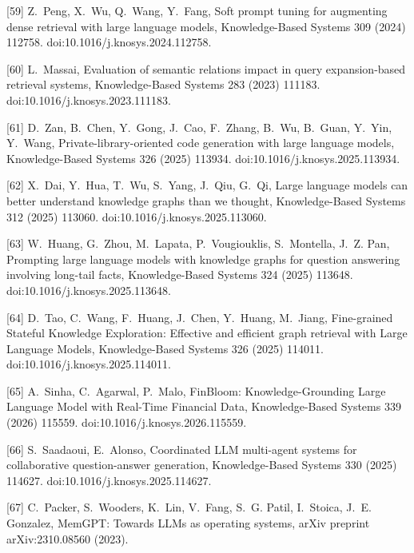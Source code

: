 \documentclass[11pt]{article}
\begin{document}
[59] 
Z.~Peng, X.~Wu, Q.~Wang, Y.~Fang, {Soft prompt tuning for augmenting dense
  retrieval with large language models}, Knowledge-Based Systems 309 (2024)
  112758.
  doi:10.1016/j.knosys.2024.112758.



[60] 
L.~Massai, {Evaluation of semantic relations impact in query expansion-based
  retrieval systems}, Knowledge-Based Systems 283 (2023) 111183.
  doi:10.1016/j.knosys.2023.111183.



[61] 
D.~Zan, B.~Chen, Y.~Gong, J.~Cao, F.~Zhang, B.~Wu, B.~Guan, Y.~Yin, Y.~Wang,
  {Private-library-oriented code generation with large language models},
  Knowledge-Based Systems 326 (2025) 113934.
  doi:10.1016/j.knosys.2025.113934.



[62] 
X.~Dai, Y.~Hua, T.~Wu, S.~Yang, J.~Qiu, G.~Qi, {Large language models can
  better understand knowledge graphs than we thought}, Knowledge-Based Systems
  312 (2025) 113060.
  doi:10.1016/j.knosys.2025.113060.



[63] 
W.~Huang, G.~Zhou, M.~Lapata, P.~Vougiouklis, S.~Montella, J.~Z. Pan,
  {Prompting large language models with knowledge graphs for question answering
  involving long-tail facts}, Knowledge-Based Systems 324 (2025) 113648.
  doi:10.1016/j.knosys.2025.113648.



[64] 
D.~Tao, C.~Wang, F.~Huang, J.~Chen, Y.~Huang, M.~Jiang, {Fine-grained Stateful
  Knowledge Exploration: Effective and efficient graph retrieval with Large
  Language Models}, Knowledge-Based Systems 326 (2025) 114011.
  doi:10.1016/j.knosys.2025.114011.



[65] 
A.~Sinha, C.~Agarwal, P.~Malo, {FinBloom: Knowledge-Grounding Large Language
  Model with Real-Time Financial Data}, Knowledge-Based Systems 339 (2026)
  115559.
  doi:10.1016/j.knosys.2026.115559.



[66] 
S.~Saadaoui, E.~Alonso, {Coordinated LLM multi-agent systems for collaborative
  question-answer generation}, Knowledge-Based Systems 330 (2025) 114627.
  doi:10.1016/j.knosys.2025.114627.



[67] 
C.~Packer, S.~Wooders, K.~Lin, V.~Fang, S.~G. Patil, I.~Stoica, J.~E. Gonzalez,
  {MemGPT}: Towards {LLMs} as operating systems, arXiv preprint
  arXiv:2310.08560 (2023).
\end{document}
